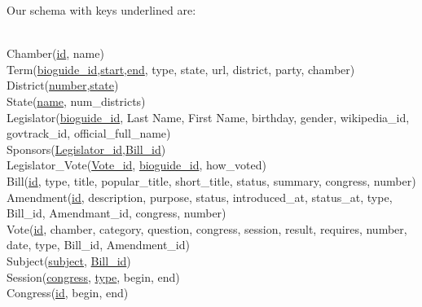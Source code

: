 \documentclass{article}
\begin{document}
\noindent
Our schema with keys underlined are:\\
\\

\begin{tt}
\iffalse
Base relations:\\ Party ( \underline{name} )\\ Congressperson ( \underline{name} ) \\ Chamber of Congress ( \underline{name}, seats )\\ Bill ( \underline{name}, \underline{bill\_ID}, text )\\ State ( \underline{name}, number of representatives ) \\ Senator ( \underline{name} ) \\ Representative ( \underline{name} , district ) \\
\\
Relations from relationships: \\
Congress Person ( \underline{Name}, Party, Chamber, State, Is\_a ) $<$--chamber define is\_a relationship? \\
Bill ( \underline{Name}, \underline{Bill\_ID}, Text, Sponsors, Chamber ) $<$--outcome of vote? \\
Represents district (\underline{district name}, representative, state) \\
Vote ( \underline{bill}, \underline{bill\_id}, chamber, how voted ) $<$-- want to be able to link congress person to a vote
\fi

\noindent
Chamber(\underline{id}, name)\\
Term(\underline{bioguide\_id},\underline{start},\underline{end}, type, state, url, district, party, chamber)\\
District(\underline{number},\underline{state})\\
State(\underline{name}, num\_districts)\\
Legislator(\underline{bioguide\_id}, Last Name, First Name, birthday, gender, wikipedia\_id, govtrack\_id, official\_full\_name)\\
Sponsors(\underline{Legislator\_id},\underline{Bill\_id})\\
Legislator\_Vote(\underline{Vote\_id}, \underline{bioguide\_id}, how\_voted)\\
Bill(\underline{id}, type, title, popular\_title, short\_title, status, summary, congress, number)\\
Amendment(\underline{id}, description, purpose, status, introduced\_at, status\_at, type, Bill\_id, Amendmant\_id, congress, number)\\
Vote(\underline{id}, chamber, category, question, congress, session, result, requires, number, date, type, Bill\_id, Amendment\_id)\\
Subject(\underline{subject}, \underline{Bill\_id})\\
Session(\underline{congress}, \underline{type}, begin, end)\\
Congress(\underline{id}, begin, end)\\
\end{tt}
\end{document}
